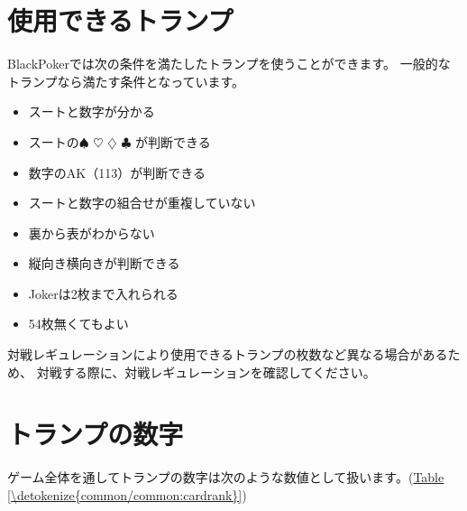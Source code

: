 \documentclass[letterpaper,10pt,dvipdfmx]{sphinxmanual}
\begin{document}
\section{使用できるトランプ}
\label{\detokenize{common/common:id4}}
\sphinxAtStartPar
BlackPokerでは次の条件を満たしたトランプを使うことができます。
一般的なトランプなら満たす条件となっています。
\begin{itemize}
\item {} 
\sphinxAtStartPar
スートと数字が分かる

\item {} 
\sphinxAtStartPar
スートの{\normalsize $\spadesuit$} {\normalsize $\heartsuit$} {\normalsize $\diamondsuit$} {\normalsize $\clubsuit$} が判断できる

\item {} 
\sphinxAtStartPar
数字のA\sphinxhyphen{}K（1\sphinxhyphen{}13）が判断できる

\item {} 
\sphinxAtStartPar
スートと数字の組合せが重複していない

\item {} 
\sphinxAtStartPar
裏から表がわからない

\item {} 
\sphinxAtStartPar
縦向き横向きが判断できる

\item {} 
\sphinxAtStartPar
Jokerは2枚まで入れられる

\item {} 
\sphinxAtStartPar
54枚無くてもよい

\end{itemize}

\sphinxAtStartPar
対戦レギュレーションにより使用できるトランプの枚数など異なる場合があるため、
対戦する際に、対戦レギュレーションを確認してください。


\section{トランプの数字}
\label{\detokenize{common/common:id5}}
\sphinxAtStartPar
ゲーム全体を通してトランプの数字は次のような数値として扱います。(\hyperref[\detokenize{common/common:cardrank}]{Table \ref{\detokenize{common/common:cardrank}}})
\end{document}
